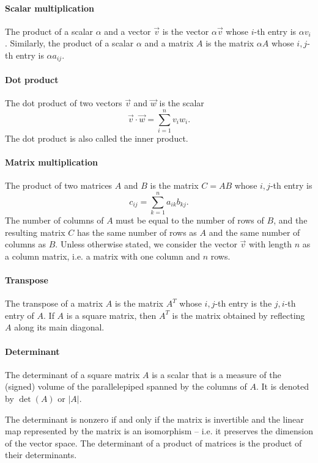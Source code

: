 \paragraph{Scalar multiplication}  The product of a scalar $\alpha$ and a vector $\vec{v}$
is the vector $\alpha \vec{v}$ whose $i$-th entry is $\alpha v_i$.  Similarly, the product of a
scalar $\alpha$ and a matrix $A$ is the matrix $\alpha A$ whose $i, j$-th entry is
$\alpha a_{ij}$.

\paragraph{Dot product}  The dot product of two vectors $\vec{v}$ and $\vec{w}$ is the
scalar $$\vec{v} \cdot \vec{w} = \sum_{i = 1}^n v_i w_i\text{.}$$  The dot product is also called
the inner product.

\paragraph{Matrix multiplication}  The product of two matrices $A$ and $B$ is the matrix
$C = A B$ whose $i, j$-th entry is $$c_{ij} = \sum_{k = 1}^n a_{ik} b_{kj}\text{.}$$
The number of columns of $A$ must be equal to the number of rows of $B$, and the
resulting matrix $C$ has the same number of rows as $A$ and the same number of columns as $B$.
Unless otherwise stated, we consider the vector $\vec{v}$ with length $n$ as a column
matrix, i.e. a matrix with one column and $n$ rows.

\paragraph{Transpose}  The transpose of a matrix $A$ is the matrix $A^T$ whose $i, j$-th
entry is the $j, i$-th entry of $A$.  If $A$ is a square matrix, then $A^T$ is the
matrix obtained by reflecting $A$ along its main diagonal.

\paragraph{Determinant}  The determinant of a square matrix $A$ is a scalar that is a
measure of the (signed) volume of the parallelepiped spanned by the columns of $A$.  It is
denoted by $\det(A)$ or $|A|$.

The determinant is nonzero if and only if the matrix is invertible and the linear map
represented by the matrix is an isomorphism -- i.e. it preserves the dimension of the
vector space.  The determinant of a product of matrices is the product of their
determinants.

